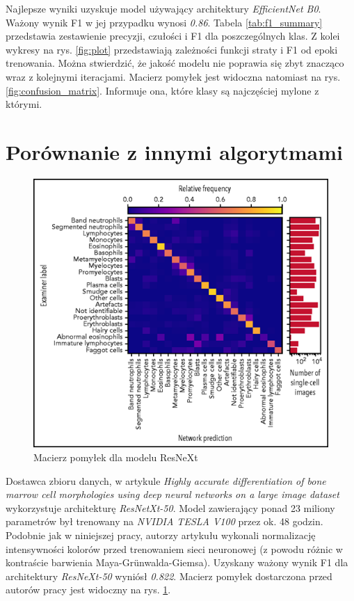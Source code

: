 Najlepsze wyniki uzyskuje model używający architektury \textit{EfficientNet B0}. Ważony wynik F1 w jej przypadku wynosi \textit{0.86}.
Tabela \ref{tab:f1_summary} przedstawia zestawienie precyzji, czułości i F1 dla poszczególnych klas.
Z kolei wykresy na rys. \ref{fig:plot} przedstawiają zależności funkcji straty i F1 od epoki trenowania.
Można stwierdzić, że jakość modelu nie poprawia się zbyt znacząco wraz z kolejnymi iteracjami.
Macierz pomyłek jest widoczna natomiast na rys. \ref{fig:confusion_matrix}.
Informuje ona, które klasy są najczęściej mylone z którymi.

\section{Porównanie z innymi algorytmami}

\begin{figure}
    \centering
    \includegraphics[width=\textwidth]{resnext_confusion_matrix}
    \caption{Macierz pomyłek dla modelu ResNeXt}
    \label{fig:resnext_confusion_matrix}
\end{figure}

Dostawca zbioru danych, w artykule \textit{Highly accurate differentiation of bone marrow cell morphologies using deep neural networks on a large image dataset} \cite{resnext} wykorzystuje architekturę \textit{ResNetXt-50}.
Model zawierający ponad 23 miliony parametrów był trenowany na \textit{NVIDIA TESLA V100} przez ok. 48 godzin.
Podobnie jak w niniejszej pracy, autorzy artykułu wykonali normalizację intensywności kolorów przed trenowaniem sieci neuronowej (z powodu różnic w kontraście barwienia Maya-Grünwalda-Giemsa).
Uzyskany ważony wynik F1 dla architektury \textit{ResNeXt-50} wyniósł \textit{0.822}. Macierz pomyłek dostarczona przed autorów pracy jest widoczny na rys. \ref{fig:resnext_confusion_matrix}.

